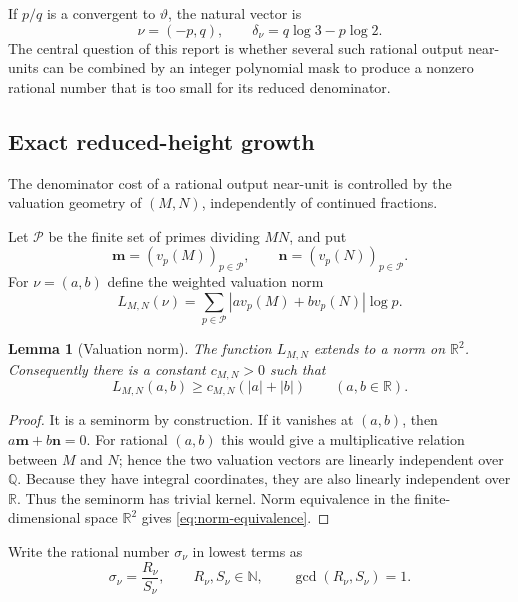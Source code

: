 \documentclass[11pt,oneside]{article}
\newtheorem{lemma}[theorem]{Lemma}
\theoremstyle{definition}
\theoremstyle{remark}
\newcommand{\N}{\mathbb N}
\newcommand{\Q}{\mathbb Q}
\newcommand{\R}{\mathbb R}
\newcommand{\thetaAE}{\vartheta}
\begin{document}
If $p/q$ is a convergent to $\thetaAE$, the natural vector is
\begin{equation}
  \nu=(-p,q),
  \qquad
  \delta_\nu=q\log3-p\log2.
  \label{eq:cf-vector}
\end{equation}
The central question of this report is whether several such rational output near-units can
be combined by an integer polynomial mask to produce a nonzero rational number that is too
small for its reduced denominator.

\subsection{Exact reduced-height growth}
\label{subsec:height}

The denominator cost of a rational output near-unit is controlled by the valuation geometry
of $(M,N)$, independently of continued fractions.

Let $\mathcal P$ be the finite set of primes dividing $MN$, and put
\[
  \mathbf m=(v_p(M))_{p\in\mathcal P},
  \qquad
  \mathbf n=(v_p(N))_{p\in\mathcal P}.
\]
For $\nu=(a,b)$ define the weighted valuation norm
\begin{equation}
  L_{M,N}(\nu)
   =\sum_{p\in\mathcal P}|a v_p(M)+b v_p(N)|\log p.
  \label{eq:valuation-norm}
\end{equation}

\begin{lemma}[Valuation norm]
\label{lem:valuation-norm}
The function $L_{M,N}$ extends to a norm on $\R^2$.  Consequently there is a constant
$c_{M,N}>0$ such that
\begin{equation}
  L_{M,N}(a,b)\ge c_{M,N}(|a|+|b|)
  \qquad(a,b\in\R).
  \label{eq:norm-equivalence}
\end{equation}
\end{lemma}

\begin{proof}
It is a seminorm by construction.  If it vanishes at $(a,b)$, then
$a\mathbf m+b\mathbf n=0$.  For rational $(a,b)$ this would give a multiplicative relation
between $M$ and $N$; hence the two valuation vectors are linearly independent over $\Q$.
Because they have integral coordinates, they are also linearly independent over $\R$.
Thus the seminorm has trivial kernel.  Norm equivalence in the finite-dimensional space
$\R^2$ gives \eqref{eq:norm-equivalence}.
\end{proof}

Write the rational number $\sigma_\nu$ in lowest terms as
\[
  \sigma_\nu=\frac{R_\nu}{S_\nu},
  \qquad R_\nu,S_\nu\in\N,
  \qquad \gcd(R_\nu,S_\nu)=1.
\]
\end{document}
